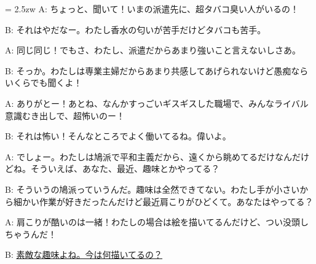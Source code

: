 \documentclass[11pt]{amsart}
\title{}
\author{}
\newenvironment{hangall}[1]{\hangindent = 2.5zw\everypar{\hangindent = 2.5zw}}{}
\begin{document}
\maketitle
\begin{hangall}{}%
A: ちょっと、聞いて！いまの派遣先に、超タバコ臭い人がいるの！

B: それはやだなー。わたし香水の匂いが苦手だけどタバコも苦手。

A: 同じ同じ！でもさ、わたし、派遣だからあまり強いこと言えないしさあ。

B: そっか。わたしは専業主婦だからあまり共感してあげられないけど愚痴ならいくらでも聞くよ！

A: ありがとー！あとね、なんかすっごいギスギスした職場で、みんなライバル意識むき出しで、超怖いのー！

B: それは怖い！そんなところでよく働いてるね。偉いよ。

A: でしょー。わたしは鳩派で平和主義だから、遠くから眺めてるだけなんだけどね。そういえば、あなた、最近、趣味とかやってる？

B: そういうの鳩派っていうんだ。趣味は全然できてない。わたし手が小さいから細かい作業が好きだったんだけど最近肩こりがひどくて。あなたはやってる？

A: 肩こりが酷いのは一緒！わたしの場合は絵を描いてるんだけど、つい没頭しちゃうんだ！

B: \ul{素敵な趣味よね。今は何描いてるの？}\end{hangall}
\end{document}
